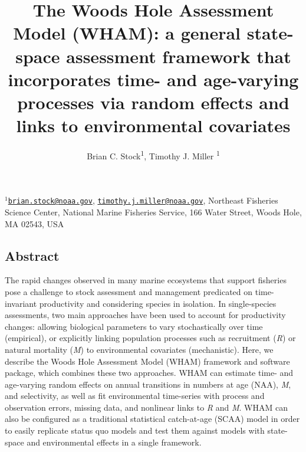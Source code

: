 \documentclass[]{article}
\title{The Woods Hole Assessment Model (WHAM): a general state-space assessment
framework that incorporates time- and age-varying processes via random
effects and links to environmental covariates}
\author{Brian C. Stock\textsuperscript{1}, Timothy J. Miller \textsuperscript{1}}
\date{}
\begin{document}
\maketitle

\(^1\)\href{mailto:brian.stock@noaa.gov}{\nolinkurl{brian.stock@noaa.gov}},
\href{mailto:timothy.j.miller@noaa.gov}{\nolinkurl{timothy.j.miller@noaa.gov}},
Northeast Fisheries Science Center, National Marine Fisheries Service,
166 Water Street, Woods Hole, MA 02543, USA\\

\pagebreak

\hypertarget{abstract}{%
\subsection*{Abstract}\label{abstract}}

The rapid changes observed in many marine ecosystems that support
fisheries pose a challenge to stock assessment and management predicated
on time-invariant productivity and considering species in isolation. In
single-species assessments, two main approaches have been used to
account for productivity changes: allowing biological parameters to vary
stochastically over time (empirical), or explicitly linking population
processes such as recruitment (\emph{R}) or natural mortality (\emph{M})
to environmental covariates (mechanistic). Here, we describe the Woods
Hole Assessment Model (WHAM) framework and software package, which
combines these two approaches. WHAM can estimate time- and age-varying
random effects on annual transitions in numbers at age (NAA), \emph{M},
and selectivity, as well as fit environmental time-series with process
and observation errors, missing data, and nonlinear links to \emph{R}
and \emph{M}. WHAM can also be configured as a traditional statistical
catch-at-age (SCAA) model in order to easily replicate status quo models
and test them against models with state-space and environmental effects
in a single framework.
\end{document}
